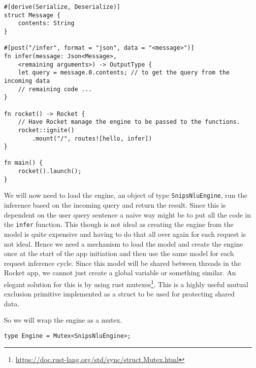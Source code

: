 \documentclass{book}
\begin{document}
\begin{lstlisting}[caption={chapter5\\/snips\\-model\\/src\\/main\\.rs}, basicstyle=\small]
#[derive(Serialize, Deserialize)]
struct Message {
    contents: String
}

#[post("/infer", format = "json", data = "<message>")]
fn infer(message: Json<Message>,
	<remaining arguments>) -> OutputType {
    let query = message.0.contents; // to get the query from the incoming data
    // remaining code ...
}

fn rocket() -> Rocket {
    // Have Rocket manage the engine to be passed to the functions.
    rocket::ignite()
        .mount("/", routes![hello, infer])
}

fn main() {
    rocket().launch();
}
\end{lstlisting}

We will now need to load the engine, an object of type \lstinline{SnipsNluEngine}, run the inference based on the incoming query and return the result. Since this is dependent on the user query sentence a naive way might be to put all the code in the \lstinline{infer} function. This though is not ideal as creating the engine from the model is quite expensive and having to do that all over again for each request is not ideal. Hence we need a mechanism to load the model and create the engine once at the start of the app initiation and then use the same model for each request inference cycle. Since this model will be shared between threads in the Rocket app, we cannot just create a global variable or something similar. An elegant solution for this is by using rust mutexes\footnote{\href{}{https://doc.rust-lang.org/std/sync/struct.Mutex.html}}. This is a highly useful mutual exclusion primitive implemented as a struct to be used for protecting shared data.

So we will wrap the engine as a mutex.

\begin{lstlisting}[caption={chapter5\\/snips\\-model\\/src\\/main\\.rs}, basicstyle=\small]
type Engine = Mutex<SnipsNluEngine>;
\end{lstlisting}
\end{document}
